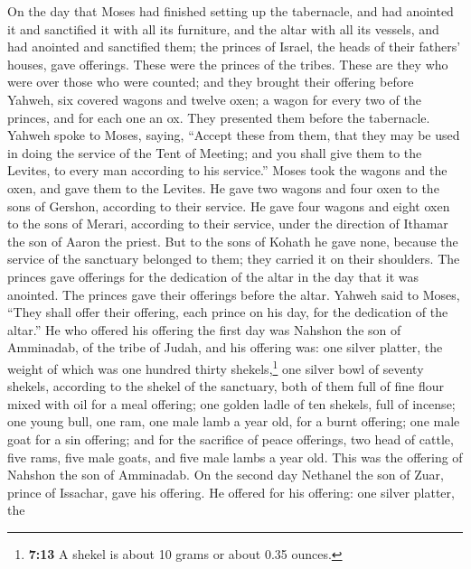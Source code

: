 \begin{paracol}{2}
\begin{otherlanguage}{english}
 On the day that Moses had finished setting up the
tabernacle, and had anointed it and sanctified it with all its
furniture, and the altar with all its vessels, and had anointed and
sanctified them;  the princes of Israel, the heads of
their fathers' houses, gave offerings. These were the princes of the
tribes. These are they who were over those who were counted;
 and they brought their offering before Yahweh, six
covered wagons and twelve oxen; a wagon for every two of the princes,
and for each one an ox. They presented them before the tabernacle.
 Yahweh spoke to Moses, saying,  ``Accept
these from them, that they may be used in doing the service of the Tent
of Meeting; and you shall give them to the Levites, to every man
according to his service.''  Moses took the wagons and the
oxen, and gave them to the Levites.  He gave two wagons
and four oxen to the sons of Gershon, according to their service.
 He gave four wagons and eight oxen to the sons of Merari,
according to their service, under the direction of Ithamar the son of
Aaron the priest.  But to the sons of Kohath he gave none,
because the service of the sanctuary belonged to them; they carried it
on their shoulders.  The princes gave offerings for the
dedication of the altar in the day that it was anointed. The princes
gave their offerings before the altar.  Yahweh said to
Moses, ``They shall offer their offering, each prince on his day, for
the dedication of the altar.''  He who offered his
offering the first day was Nahshon the son of Amminadab, of the tribe of
Judah,  and his offering was: one silver platter, the
weight of which was one hundred thirty shekels,\footnote{\textbf{7:13} A
  shekel is about 10 grams or about 0.35 ounces.} one silver bowl of
seventy shekels, according to the shekel of the sanctuary, both of them
full of fine flour mixed with oil for a meal offering; 
one golden ladle of ten shekels, full of incense;  one
young bull, one ram, one male lamb a year old, for a burnt offering;
 one male goat for a sin offering;  and
for the sacrifice of peace offerings, two head of cattle, five rams,
five male goats, and five male lambs a year old. This was the offering
of Nahshon the son of Amminadab.  On the second day
Nethanel the son of Zuar, prince of Issachar, gave his offering.
 He offered for his offering: one silver platter, the

\end{otherlanguage}
\end{paracol}
